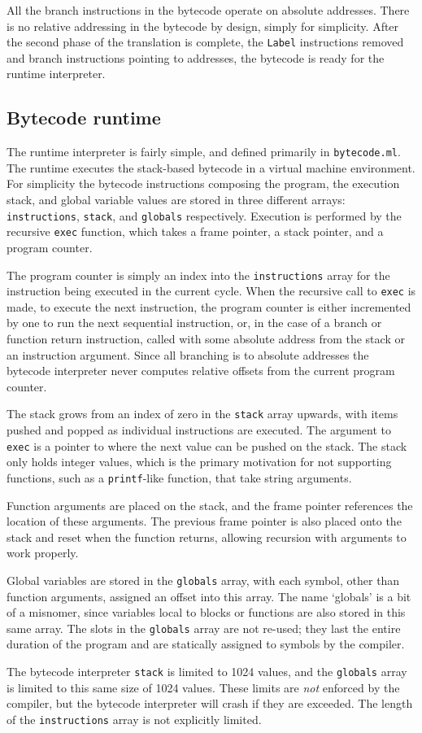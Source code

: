 All the branch instructions in the bytecode operate on absolute addresses.  There is no relative addressing in the bytecode by design, simply for simplicity.  After the second phase of the translation is complete, the \texttt{Label} instructions removed and branch instructions pointing to addresses, the bytecode is ready for the runtime interpreter.

\subsection{Bytecode runtime}
The runtime interpreter is fairly simple, and defined primarily in \texttt{bytecode.ml}.  The runtime executes the stack-based bytecode in a virtual machine environment.  For simplicity the bytecode instructions composing the program, the execution stack, and global variable values are stored in three different arrays: \texttt{instructions}, \texttt{stack}, and \texttt{globals} respectively.  Execution is performed by the recursive \texttt{exec} function, which takes a frame pointer, a stack pointer, and a program counter.

The program counter is simply an index into the \texttt{instructions} array for the instruction being executed in the current cycle.  When the recursive call to \texttt{exec} is made, to execute the next instruction, the program counter is either incremented by one to run the next sequential instruction, or, in the case of a branch or function return instruction, called with some absolute address from the stack or an instruction argument.  Since all branching is to absolute addresses the bytecode interpreter never computes relative offsets from the current program counter.

The stack grows from an index of zero in the \texttt{stack} array upwards, with items pushed and popped as individual instructions are executed.  The argument to \texttt{exec} is a pointer to where the next value can be pushed on the stack.  The stack only holds integer values, which is the primary motivation for not supporting functions, such as a \texttt{printf}-like function, that take string arguments.

Function arguments are placed on the stack, and the frame pointer references the location of these arguments.  The previous frame pointer is also placed onto the stack and reset when the function returns, allowing recursion with arguments to work properly.

Global variables are stored in the \texttt{globals} array, with each symbol, other than function arguments, assigned an offset into this array.  The name `globals' is a bit of a misnomer, since variables local to blocks or functions are also stored in this same array.  The slots in the \texttt{globals} array are not re-used; they last the entire duration of the program and are statically assigned to symbols by the compiler.

The bytecode interpreter \texttt{stack} is limited to 1024 values, and the \texttt{globals} array is limited to this same size of 1024 values.  These limits are \emph{not} enforced by the compiler, but the bytecode interpreter will crash if they are exceeded.  The length of the \texttt{instructions} array is not explicitly limited.
